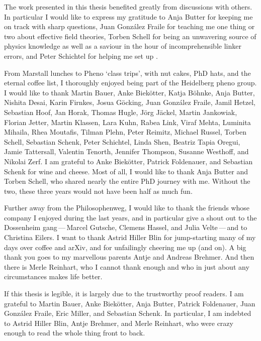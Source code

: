 The work presented in this thesis benefited greatly from discussions
with others. In particular I would like to express my gratitude to
Anja Butter for keeping me on track with sharp questions, Juan
Gonz\'alez Fraile for teaching me one thing or two about effective
field theories, Torben Schell for being an unwavering source of physics
knowledge as well as a saviour in the hour of incomprehensible linker
errors, and Peter Schichtel for helping me set up
.

From Marstall lunches to Pheno `class trips', with nut cakes, PhD
hats, and the eternal coffee list,
%
I thoroughly enjoyed being part of the Heidelberg pheno group.
%
%
I would like to thank Martin
Bauer, Anke Biek\"otter, Katja B\"ohnke, Anja Butter, Nishita Desai,
Karin Firnkes, Josua G\"ocking, Juan Gonz\'alez Fraile, Jamil Hetzel,
Sebastian Hoof, Jan Horak, Thomas Hugle, J\"org J\"ackel, Martin
Jankowiak, Florian Jetter, Martin Klassen, Lara Kuhn, Rabea Link,
Viraf Mehta, Luminita Mihaila, Rhea Moutafis, Tilman Plehn, Peter
Reimitz, Michael Russel, Torben Schell, Sebastian Schenk, Peter
Schichtel, Linda Shen, Beatriz Tapia Oregui, Jamie Tattersall,
Valentin Tenorth, Jennifer Thompson, Susanne Westhoff, and Nikolai
Zerf. I am grateful to Anke Biek\"otter, Patrick Foldenauer, and
Sebastian Schenk for wine and cheese. Most of
all, I would like to thank Anja Butter and Torben Schell, who shared
nearly the entire PhD journey with me. Without the two, these three
years would not have been half as much fun.

Further away from the Philosophenweg, I would like to thank the
friends whose company I enjoyed during the last years, and in
particular give a shout out to the Dossenheim gang\,---\,Marcel
Gutsche, Clemens Hassel, and Julia Velte\,---\,and to Christina
Eilers. I want to thank Astrid Hiller Blin for jump-starting many of
my days over coffee and arXiv, and for unfailingly cheering me up (and
on). A big thank you goes to my marvellous parents Antje and Andreas
Brehmer. And then there is Merle Reinhart, who I cannot thank enough
and who in just about any circumstances makes life better.

If this thesis is legible, it is largely due to the trustworthy proof
readers. I am grateful to Martin Bauer, Anke Biek\"otter, Anja Butter,
Patrick Foldenauer, Juan Gonz\'alez Fraile, Eric Miller, and Sebastian
Schenk. In particular, I am indebted to Astrid Hiller Blin, Antje
Brehmer, and Merle Reinhart, who were crazy enough to read the whole
thing front to back.

